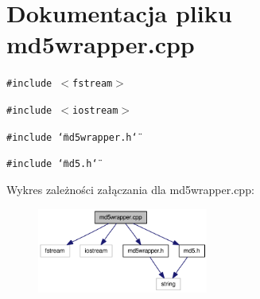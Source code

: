 \hypertarget{a00012}{
\section{Dokumentacja pliku md5wrapper.cpp}
\label{df/d86/a00012}
}
{\tt \#include $<$fstream$>$}\par
{\tt \#include $<$iostream$>$}\par
{\tt \#include \char`\"{}md5wrapper.h\char`\"{}}\par
{\tt \#include \char`\"{}md5.h\char`\"{}}\par


Wykres zależności załączania dla md5wrapper.cpp:\nopagebreak
\begin{figure}[H]
\begin{center}
\leavevmode
\includegraphics[width=159pt]{d5/df9/a00044}
\end{center}
\end{figure}
